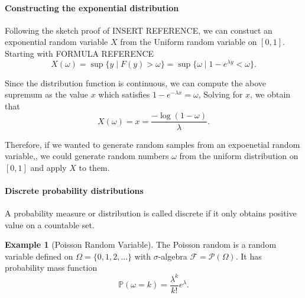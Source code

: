 \documentclass[12pt]{article}
\newcommand{\calF}{\mathcal{F}}
\newcommand{\Prob}{\mathbb{P}}
\theoremstyle{definition}
\newtheorem{exmp}[thm]{Example}
\theoremstyle{remark}
\numberwithin{equation}{section}
\begin{document}
\paragraph{Constructing the exponential distribution}%
\label{par:constructing_the_exponential_distribution}

Following the sketch proof of INSERT REFERENCE, we can constuct an exponential random variable $X$ from the Uniform random variable on $[0,1]$. Starting with FORMULA REFERENCE
\begin{equation}
  X(\omega) = \sup\{y \mid F(y) > \omega \} = \sup\{ \omega \mid 1 - e^{\lambda y} < \omega \}.
\end{equation}

Since the distribution function is continuous, we can compute the above supremum as the value $x$ which satisfies $1 - e^{-\lambda x} = \omega$, Solving for $x$, we obtain that 
\begin{equation}
  X(\omega) = x = \frac{-\log(1-\omega)}{\lambda}.
\end{equation}

Therefore, if we wanted to generate random samples from an expoenetial random variable,, we could generate random numbers $\omega$ from the uniform distribution on $[0,1]$ and apply $X$ to them.


\paragraph{Discrete probability distributions}%
\label{par:discrete_probability_distributions}

A probability measure or distribution is called discrete if it only obtains positive value on a countable set.


\begin{exmp}[Poisson Random Variable]
  The Poisson random is a random variable defined on $\Omega = \{ 0, 1, 2 , \ldots \}$ with $\sigma$-algebra $\calF = \mathcal{P}(\Omega)$. It has probability mass function
  \begin{equation}
    \Prob(\omega = k) = \frac{\lambda^k}{k!} e^\lambda.
  \end{equation}
\end{exmp}
\end{document}
